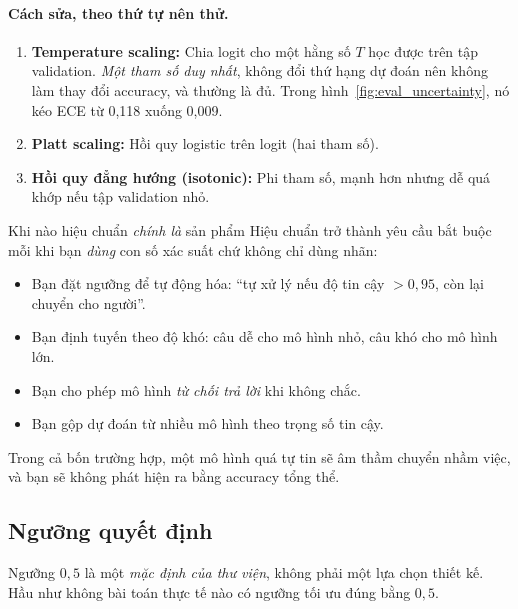 \paragraph{Cách sửa, theo thứ tự nên thử.}
\begin{enumerate}
	\item \textbf{Temperature scaling:} Chia logit cho một hằng số $T$ học được trên tập validation. \emph{Một tham số duy nhất}, không đổi thứ hạng dự đoán nên không làm thay đổi accuracy, và thường là đủ. Trong hình~\ref{fig:eval_uncertainty}, nó kéo ECE từ 0{,}118 xuống 0{,}009.
	\item \textbf{Platt scaling:} Hồi quy logistic trên logit (hai tham số).
	\item \textbf{Hồi quy đẳng hướng (isotonic):} Phi tham số, mạnh hơn nhưng dễ quá khớp nếu tập validation nhỏ.
\end{enumerate}

\begin{deepdive}{Khi nào hiệu chuẩn \emph{chính là} sản phẩm}
Hiệu chuẩn trở thành yêu cầu bắt buộc mỗi khi bạn \emph{dùng} con số xác suất chứ không chỉ dùng nhãn:
\begin{itemize}
	\item Bạn đặt ngưỡng để tự động hóa: “tự xử lý nếu độ tin cậy $> 0{,}95$, còn lại chuyển cho người”.
	\item Bạn định tuyến theo độ khó: câu dễ cho mô hình nhỏ, câu khó cho mô hình lớn.
	\item Bạn cho phép mô hình \emph{từ chối trả lời} khi không chắc.
	\item Bạn gộp dự đoán từ nhiều mô hình theo trọng số tin cậy.
\end{itemize}
Trong cả bốn trường hợp, một mô hình quá tự tin sẽ âm thầm chuyển nhầm việc, và bạn sẽ không phát hiện ra bằng accuracy tổng thể.
\end{deepdive}

\subsection{Ngưỡng quyết định}
\label{ssec:decision_threshold}

Ngưỡng $0{,}5$ là một \emph{mặc định của thư viện}, không phải một lựa chọn thiết kế. Hầu như không bài toán thực tế nào có ngưỡng tối ưu đúng bằng $0{,}5$.

